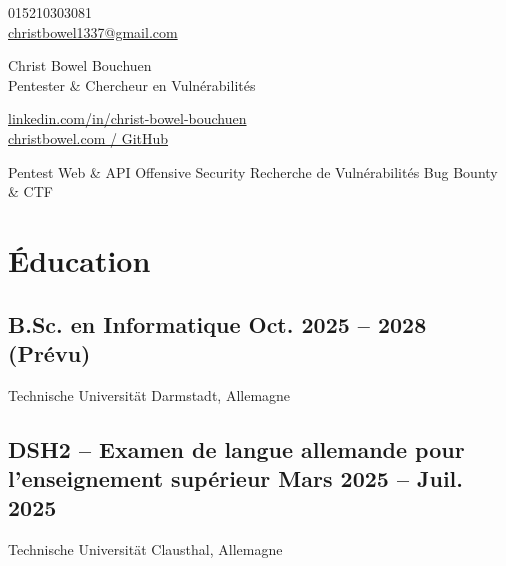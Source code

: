 \documentclass[a4paper,10pt]{article}
\newcommand{\subtext}[1]{#1\par\vspace{-0.2cm}}
\begin{document}
\begin{center}
    \begin{minipage}[b]{0.30\textwidth}
            \large 015210303081 \\
            \large \href{mailto:christbowel1337@gmail.com}{christbowel1337@gmail.com} 
    \end{minipage}%
    \begin{minipage}[b]{0.40\textwidth}
            \centering
            {\Huge Christ Bowel Bouchuen} \\ 
            \vspace{0.1cm}
            {\color{UI_blue} \Large{Pentester \& Chercheur en Vulnérabilités}} 
    \end{minipage}%
    \begin{minipage}[b]{0.30\textwidth}
            \flushright \large 
            \href{https://linkedin.com/in/christ-bowel-bouchuen-207a76251}{linkedin.com/in/christ-bowel-bouchuen} \\
            \href{https://christbowel.com}{christbowel.com / GitHub}
    \end{minipage}   
    \vspace{0.1cm} 
    {\color{UI_blue} \hrulefill}
\end{center}

\vspace{-0.25cm}
\begin{center}
    \textbullet \hspace{0.1cm} Pentest Web \& API \hspace{0.3cm}
    \textbullet \hspace{0.1cm} Offensive Security \hspace{0.3cm}
    \textbullet \hspace{0.1cm} Recherche de Vulnérabilités \hspace{0.3cm}
    \textbullet \hspace{0.1cm} Bug Bounty \& CTF
\end{center}

\section{Éducation}
\subsection*{B.Sc. en Informatique \hfill Oct. 2025 -- 2028 (Prévu)} 
\subtext{Technische Universität Darmstadt, Allemagne}

\subsection*{DSH2 -- Examen de langue allemande pour l'enseignement supérieur \hfill Mars 2025 -- Juil. 2025} 
\subtext{Technische Universität Clausthal, Allemagne}
\end{document}
